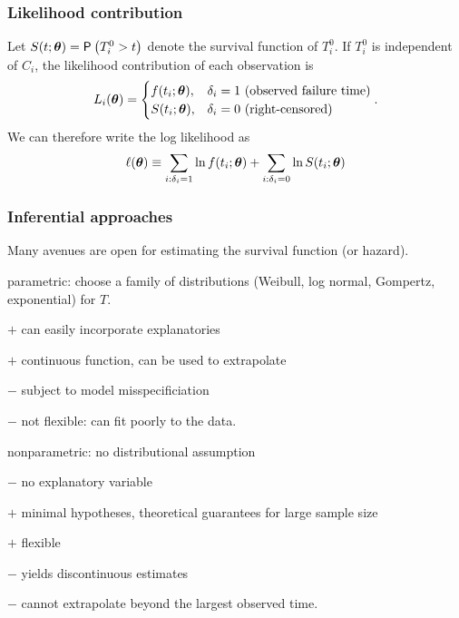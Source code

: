 \documentclass{beamer}
\begin{document}
\begin{frame}
\frametitle{Likelihood contribution}
Let $S(t; \boldsymbol {\theta}) = {\mathsf P}_{}\left(T_{i}^0 > t\right)$ denote the survival function of $T_i^0$. If $T_i^0$ is independent of $C_i$, the likelihood contribution of each observation is
\begin{align*}
L_i(\boldsymbol {\theta}) = 
\begin{cases} 
f(t_i; \boldsymbol {\theta}), & \delta_i=1 \text{ (observed failure time)}\\
S(t_i; \boldsymbol {\theta}), & \delta_i=0 \text{ (right-censored)}
\end{cases}.
\end{align*}
We can therefore write the log likelihood as
\begin{align*}
\ell(\boldsymbol {\theta}) \equiv \sum_{i: \delta_i=1} \ln f(t_i; \boldsymbol {\theta}) + \sum_{i: \delta_i=0} \ln S(t_i; \boldsymbol {\theta})
\end{align*}

\end{frame}
\begin{frame}
\frametitle{Inferential approaches}

Many avenues are open for estimating the survival function (or hazard).
\bi \item parametric: choose a family of distributions (Weibull, log normal, Gompertz, exponential) for $T$.
\bi
\item[$+$] can easily incorporate explanatories
\item[$+$] continuous function, can be used to extrapolate
\item[$-$] subject to model misspecificiation
\item[$-$] not flexible: can fit poorly to the data.
\ei
\item nonparametric: no distributional assumption
\bi 
\item[$-$] no explanatory variable
\item[$+$] minimal hypotheses, theoretical guarantees for large sample size
\item[$+$] flexible
\item[$-$] yields discontinuous estimates
\item[$-$] cannot extrapolate beyond the largest observed time.
\ei
\ei
\end{frame}
\end{document}
